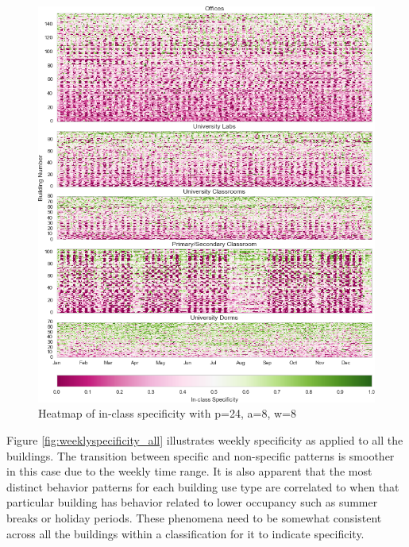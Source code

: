 \begin{figure}[ht!]
\begin{center}
\includegraphics[width=1\columnwidth]{figures/jmotif_inclassspec_allbuildings_heatmap_24_8_8/jmotif_inclassspec_allbuildings_heatmap_24_8_8}
\caption{Heatmap of in-class specificity with p=24, a=8, w=8
\label{fig:dailyspecificity_all}%
}
\end{center}
\end{figure}

Figure \ref{fig:weeklyspecificity_all} illustrates weekly specificity as applied to all the buildings. The transition between specific and non-specific patterns is smoother in this case due to the weekly time range. It is also apparent that the most distinct behavior patterns for each building use type are correlated to when that particular building has behavior related to lower occupancy such as summer breaks or holiday periods. These phenomena need to be somewhat consistent across all the buildings within a classification for it to indicate specificity.  

